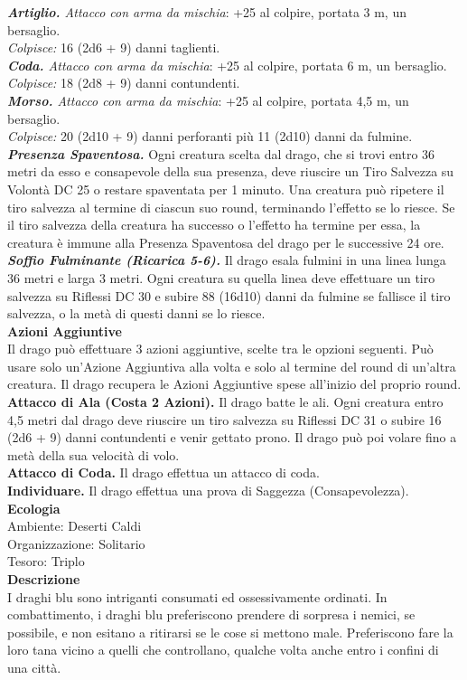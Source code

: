 \begin{multicols}{2}
\emph{\textbf{Artiglio.} Attacco con arma da mischia}: +25 al colpire, portata 3 m, un bersaglio.\\
\emph{Colpisce:} 16 (2d6 + 9) danni taglienti.\\
\emph{\textbf{Coda.} Attacco con arma da mischia}: +25 al colpire, portata 6 m, un bersaglio.\\
\emph{Colpisce:} 18 (2d8 + 9) danni contundenti.\\
\emph{\textbf{Morso.} Attacco con arma da mischia}: +25 al colpire, portata 4,5 m, un bersaglio.\\
\emph{Colpisce:} 20 (2d10 + 9) danni perforanti più 11 (2d10) danni da fulmine.\\
\emph{\textbf{Presenza Spaventosa.}} Ogni creatura scelta dal drago, che si trovi entro 36 metri da esso e consapevole della sua presenza, deve riuscire un Tiro Salvezza su Volontà DC  25 o restare spaventata per 1 minuto. Una creatura può ripetere il tiro salvezza al termine di ciascun suo round, terminando l'effetto se lo riesce. Se il tiro salvezza della creatura ha successo o l'effetto ha termine per essa, la creatura è immune alla Presenza Spaventosa del drago per le successive 24 ore.\\
\emph{\textbf{Soffio Fulminante (Ricarica 5-6).}} Il drago esala fulmini in una linea lunga 36 metri e larga 3 metri. Ogni creatura su quella linea deve effettuare un tiro salvezza su Riflessi DC  30 e subire 88 (16d10) danni da fulmine se fallisce il tiro salvezza, o la metà di questi danni se lo riesce.\\
\textbf{Azioni Aggiuntive}\\
Il drago può effettuare 3 azioni aggiuntive, scelte tra le opzioni seguenti. Può usare solo un'Azione Aggiuntiva alla volta e solo al termine del round di un'altra creatura. Il drago recupera le Azioni Aggiuntive spese all'inizio del proprio round.\\
\textbf{Attacco di Ala (Costa 2 Azioni).} Il drago batte le ali. Ogni creatura entro 4,5 metri dal drago deve riuscire un tiro salvezza su Riflessi DC  31 o subire 16 (2d6 + 9) danni contundenti e venir gettato prono. Il drago può poi volare fino a metà della sua velocità di volo.\\
\textbf{Attacco di Coda.} Il drago effettua un attacco di coda.\\
\textbf{Individuare.} Il drago effettua una prova di Saggezza (Consapevolezza).\\
\textbf{Ecologia}\\
Ambiente: Deserti Caldi\\
Organizzazione: Solitario\\
Tesoro: Triplo\\
\textbf{Descrizione}\\
I draghi blu sono intriganti consumati ed ossessivamente ordinati. In combattimento, i draghi blu preferiscono prendere di sorpresa i nemici, se possibile, e non esitano a ritirarsi se le cose si mettono male. Preferiscono fare la loro tana vicino a quelli che controllano, qualche volta anche entro i confini di una città.\\


\end{multicols}
